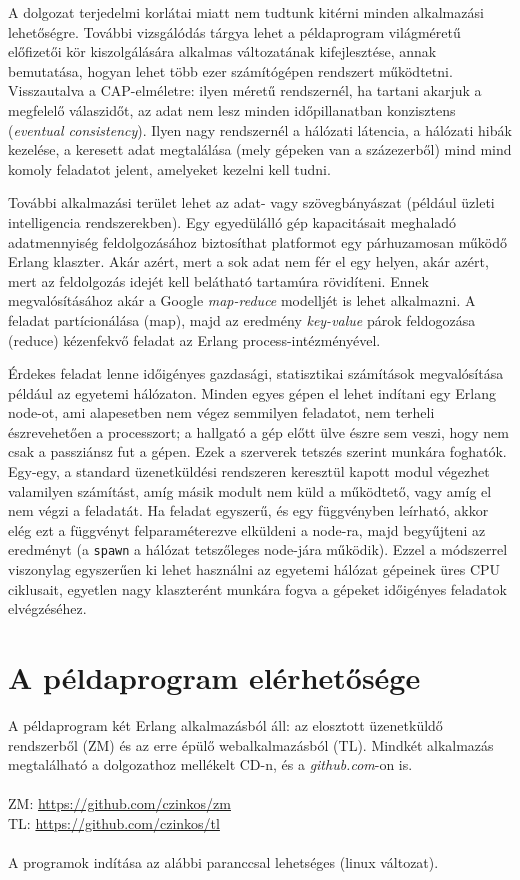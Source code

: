 \documentclass[12pt, a4paper, oneside]{book}
\begin{document}
A dolgozat terjedelmi korlátai miatt nem tudtunk kitérni minden alkalmazási
lehetőségre. További vizsgálódás tárgya lehet a példaprogram világméretű
előfizetői kör kiszolgálására alkalmas változatának kifejlesztése, annak
bemutatása, hogyan lehet több ezer számítógépen rendszert működtetni. 
Visszautalva a CAP-elméletre: ilyen méretű rendszernél, ha tartani akarjuk a
megfelelő válaszidőt, az adat nem lesz minden időpillanatban konzisztens
(\emph{eventual consistency}). Ilyen nagy rendszernél a hálózati látencia, a
hálózati hibák kezelése, a keresett adat megtalálása (mely gépeken van a
százezerből) mind mind komoly feladatot jelent, amelyeket kezelni kell tudni.

További alkalmazási terület lehet az adat- vagy szövegbányászat
(például üzleti intelligencia rendszerekben). Egy egyedülálló gép kapacitásait
meghaladó adatmennyiség feldolgozásához biztosíthat platformot egy párhuzamosan
működő Erlang klaszter. Akár azért, mert a sok adat nem fér el egy helyen, akár
azért, mert az feldolgozás idejét kell belátható tartamúra rövidíteni. Ennek
megvalósításához akár a Google \emph{map-reduce} modelljét is lehet alkalmazni. A
feladat partícionálása (map), majd az eredmény \emph{key-value} párok
feldogozása (reduce) kézenfekvő feladat az Erlang process-intézményével.

Érdekes feladat lenne időigényes gazdasági, statisztikai számítások
megvalósítása például az egyetemi hálózaton. Minden egyes gépen el lehet
indítani egy Erlang node-ot, ami alapesetben nem végez semmilyen
feladatot, nem terheli észrevehetően a processzort; a hallgató a gép előtt ülve
észre sem veszi, hogy nem csak a passziánsz fut a gépen. Ezek a 
szerverek tetszés szerint munkára foghatók. Egy-egy, a standard üzenetküldési
rendszeren keresztül kapott modul végezhet valamilyen számítást, amíg másik
modult nem küld a működtető, vagy amíg el nem végzi a feladatát. Ha feladat
egyszerű, és egy függvényben leírható, akkor elég ezt a függvényt
felparaméterezve elküldeni a node-ra, majd begyűjteni az eredményt
(a \texttt{spawn} a hálózat tetszőleges node-jára működik). Ezzel a
módszerrel viszonylag egyszerűen ki lehet használni az egyetemi
hálózat gépeinek üres CPU ciklusait, egyetlen nagy klaszterént munkára fogva a
gépeket időigényes feladatok elvégzéséhez.

\appendix
\chapter{A példaprogram elérhetősége}
A példaprogram két Erlang alkalmazásból áll: az elosztott üzenetküldő
rendszerből (ZM) és az erre épülő webalkalmazásból (TL). Mindkét alkalmazás
megtalálható a dolgozathoz mellékelt CD-n, és a \emph{github.com}-on is.
\\
\\
\noindent ZM: \url{https://github.com/czinkos/zm}\\
TL: \url{https://github.com/czinkos/tl}
\\
\\
\noindent A programok indítása az alábbi paranccsal lehetséges (linux változat).
\end{document}
